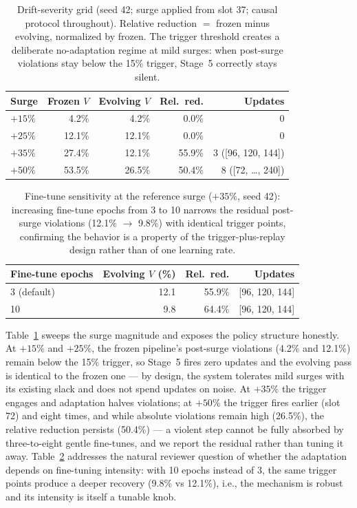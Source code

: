 \begin{table}[!t]
\caption{Drift-severity grid (seed 42; surge applied from slot 37;
causal protocol throughout). Relative reduction $=$ frozen minus
evolving, normalized by frozen. The trigger threshold creates a
deliberate no-adaptation regime at mild surges: when post-surge
violations stay below the 15\% trigger, Stage~5 correctly stays
silent.}
\label{tab:severity}
\centering
\small
\begin{tabular}{@{}lrrrr@{}}
\toprule
Surge & Frozen $V$ & Evolving $V$ & Rel.\ red. & Updates \\
\midrule
$+15\%$ & 4.2\%  & 4.2\%  & 0.0\%  & 0 \\
$+25\%$ & 12.1\% & 12.1\% & 0.0\%  & 0 \\
$+35\%$ & 27.4\% & 12.1\% & 55.9\% & 3 ([96, 120, 144]) \\
$+50\%$ & 53.5\% & 26.5\% & 50.4\% & 8 ([72, \dots, 240]) \\
\bottomrule
\end{tabular}
\end{table}

\begin{table}[!t]
\caption{Fine-tune sensitivity at the reference surge ($+35\%$, seed
42): increasing fine-tune epochs from 3 to 10 narrows the residual
post-surge violations (12.1\% $\rightarrow$ 9.8\%) with identical
trigger points, confirming the behavior is a property of the
trigger-plus-replay design rather than of one learning rate.}
\label{tab:ftepochs}
\centering
\small
\begin{tabular}{@{}lrrr@{}}
\toprule
Fine-tune epochs & Evolving $V$ (\%) & Rel.\ red. & Updates \\
\midrule
3 (default) & 12.1 & 55.9\% & [96, 120, 144] \\
10          & 9.8  & 64.4\% & [96, 120, 144] \\
\bottomrule
\end{tabular}
\end{table}

Table~\ref{tab:severity} sweeps the surge magnitude and exposes the
policy structure honestly. At $+15\%$ and $+25\%$, the frozen
pipeline's post-surge violations (4.2\% and 12.1\%) remain below the
15\% trigger, so Stage~5 fires zero updates and the evolving pass is
identical to the frozen one --- by design, the system tolerates
mild surges with its existing slack and does not spend updates on
noise. At $+35\%$ the trigger engages and adaptation halves
violations; at $+50\%$ the trigger fires earlier (slot 72) and eight
times, and while absolute violations remain high (26.5\%), the
relative reduction persists (50.4\%) --- a violent step cannot be
fully absorbed by three-to-eight gentle fine-tunes, and we report
the residual rather than tuning it away. Table~\ref{tab:ftepochs}
addresses the natural reviewer question of whether the adaptation
depends on fine-tuning intensity: with 10 epochs instead of 3, the
same trigger points produce a deeper recovery (9.8\% vs 12.1\%),
i.e., the mechanism is robust and its intensity is itself a tunable
knob.


